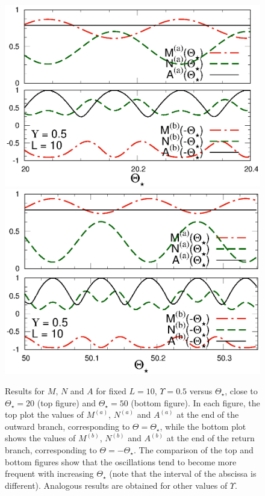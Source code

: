 \begin{figure}[!htb]
\centering
  \includegraphics[width=0.45\columnwidth]{imm/diffThstaru50s20l10.eps}
  \includegraphics[width=0.45\columnwidth]{imm/diffThstaru50s50l10.eps}
 \caption{ Results for $M,\, N$ and $A$ for fixed $L = 10$, $\Upsilon
   = 0.5$ versus $\Theta_\star$, close to $\Theta_\star = 20$ (top
   figure) and $\Theta_\star = 50$ (bottom figure). In each figure,
   the top plot the values of $M^{(a)}$, $N^{(a)}$ and $A^{(a)}$ at
   the end of the outward branch, corresponding to
   $\Theta=\Theta_\star$, while the bottom plot shows the values of
   $M^{(b)}$, $N^{(b)}$ and $A^{(b)}$ at the end of the return branch,
   corresponding to $\Theta=-\Theta_\star$. The comparison of the top
   and bottom figures show that the oscillations tend to become more
   frequent with increasing $\Theta_\star$ (note that the interval of
   the abscissa is different).  Analogous results are obtained for
   other values of $\Upsilon$.}
  \label{roundtripDiffTheta}
\end{figure}




